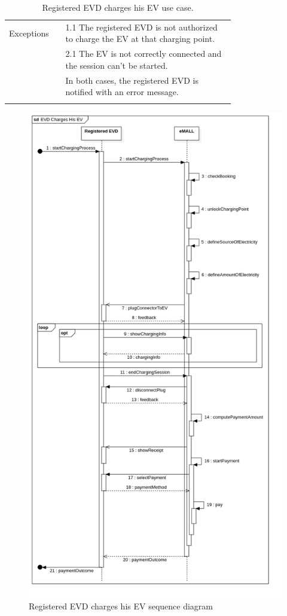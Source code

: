 \begin{center}
\begin{longtable}{lp{0.75\linewidth}}
        \hline
        Exceptions       & 1.1 The registered EVD is not authorized to charge the EV at that charging point.                                           \\
        & 2.1 The EV is not correctly connected and the session can't be started.                                                     \\
        & In both cases, the registered EVD is notified with an error message.                                                        \\
        \hline
        \caption{Registered EVD charges his EV use case.}
        \label{tab: EVD_charges_EV_use_case}
    \end{longtable}
    \begin{figure} [H]
        \begin{center}
            \includegraphics[width=0.9\linewidth]{Images/SequenceDiagrams/evd_charges_his_ev}
            \caption{Registered EVD charges his EV sequence diagram}
            \label{fig:evd_charges_ev_seq_diag}
        \end{center}
    \end{figure}
\end{center}

